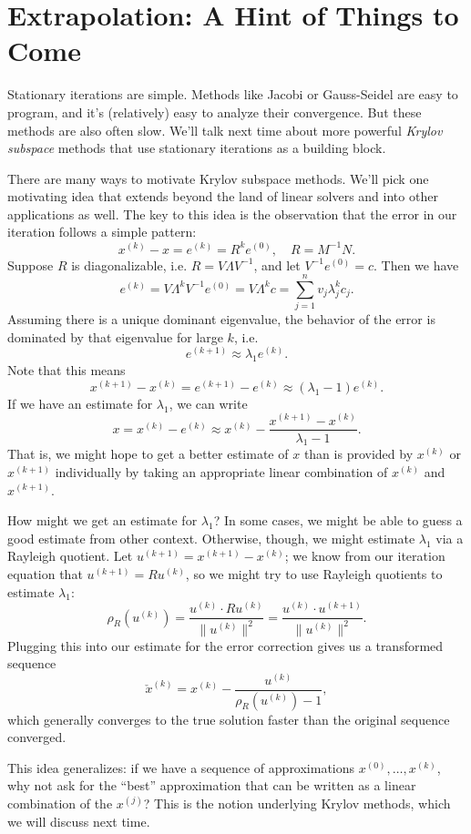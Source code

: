 \documentclass[12pt, leqno]{article}
\begin{document}
\section{Extrapolation: A Hint of Things to Come}

Stationary iterations are simple.  Methods like Jacobi or Gauss-Seidel
are easy to program, and it's (relatively) easy to analyze their
convergence.  But these methods are also often slow.  We'll talk next
time about more powerful {\em Krylov subspace} methods that use
stationary iterations as a building block.

There are many ways to motivate Krylov subspace methods.  We'll
pick one motivating idea that extends beyond
the land of linear solvers and into other applications as well.
The key to this idea is the observation that the error in our
iteration follows a simple pattern:
\[
  x^{(k)}-x = e^{(k)} = R^k e^{(0)}, \quad R = M^{-1} N.
\]
Suppose $R$ is diagonalizable, i.e. $R = V \Lambda V^{-1}$, and let
$V^{-1} e^{(0)} = c$.  Then we have
\[
  e^{(k)} = V \Lambda^{k} V^{-1} e^{(0)} = V \Lambda^k c
          = \sum_{j=1}^n v_j \lambda_j^k c_j.
\]
Assuming there is a unique dominant eigenvalue, the behavior of the
error is dominated by that eigenvalue for large $k$, i.e.
\[
  e^{(k+1)} \approx \lambda_1 e^{(k)}.
\]
Note that this means
\[
  x^{(k+1)}-x^{(k)} = e^{(k+1)}-e^{(k)} \approx (\lambda_1-1) e^{(k)}.
\]
If we have an estimate for $\lambda_1$, we can write
\[
  x = x^{(k)} - e^{(k)} \approx
  x^{(k)}-\frac{x^{(k+1)}-x^{(k)}}{\lambda_1-1}.
\]
That is, we might hope to get a better estimate of $x$ than is
provided by $x^{(k)}$ or $x^{(k+1)}$ individually by taking an
appropriate linear combination of $x^{(k)}$ and $x^{(k+1)}$.

How might we get an estimate for $\lambda_1$?  In some cases,
we might be able to guess a good estimate from other context.
Otherwise, though, we might estimate $\lambda_1$ via a Rayleigh
quotient.  Let $u^{(k+1)} = x^{(k+1)}-x^{(k)}$; we know from our
iteration equation that $u^{(k+1)} = R u^{(k)}$, so we might try
to use Rayleigh quotients to estimate $\lambda_1$:
\[
\rho_R(u^{(k)})
= \frac{u^{(k)} \cdot R u^{(k)}}{\|u^{(k)}\|^2}
= \frac{u^{(k)} \cdot u^{(k+1)}}{\|u^{(k)}\|^2}.
\]
Plugging this into our estimate for the error correction gives us
a transformed sequence
\[
\check{x}^{(k)} = x^{(k)} - \frac{u^{(k)}}{\rho_R(u^{(k)})-1},
\]
which generally converges to the true solution faster than the
original sequence converged.

This idea generalizes: if we have a sequence of approximations
$x^{(0)}, \ldots, x^{(k)}$, why not ask for the ``best'' approximation
that can be written as a linear combination of the $x^{(j)}$?  This is
the notion underlying Krylov methods, which we will discuss next time.
\end{document}
